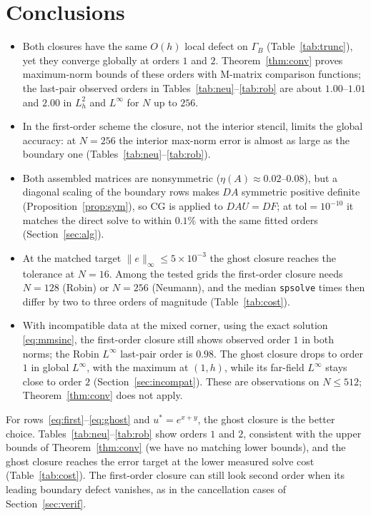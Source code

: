 \documentclass[11pt,a4paper]{article}
\theoremstyle{palplain}
\theoremstyle{paldef}
\theoremstyle{palremark}
\newcommand{\GB}{\Gamma_B}
\begin{document}
\section{Conclusions}\label{sec:concl}
\begin{itemize}[leftmargin=2em]
\item Both closures have the same $O(h)$ local defect on $\GB$ (Table~\ref{tab:trunc}), yet they
converge globally at orders $1$ and $2$. Theorem~\ref{thm:conv} proves maximum-norm bounds of
these orders with M-matrix comparison functions; the last-pair observed orders in
Tables~\ref{tab:neu}--\ref{tab:rob} are about $1.00$--$1.01$ and $2.00$ in $L^2_h$ and
$L^\infty$ for $N$ up to $256$.
\item In the first-order scheme the closure, not the interior stencil, limits the global
accuracy: at $N=256$ the interior max-norm error is almost as large as the boundary one
(Tables~\ref{tab:neu}--\ref{tab:rob}).
\item Both assembled matrices are nonsymmetric ($\eta(A)\approx0.02$--$0.08$), but a diagonal
scaling of the boundary rows makes $DA$ symmetric positive definite
(Proposition~\ref{prop:sym}), so CG is applied to $DAU=DF$; at $\mathrm{tol}=10^{-10}$ it
matches the direct solve to within $0.1\%$ with the same fitted orders (Section~\ref{sec:alg}).
\item At the matched target $\|e\|_\infty\le5\times10^{-3}$ the ghost closure reaches the tolerance
at $N=16$. Among the tested grids the first-order closure needs $N=128$ (Robin) or $N=256$
(Neumann), and the median \texttt{spsolve} times then differ by two to three orders of
magnitude (Table~\ref{tab:cost}).
\item With incompatible data at the mixed corner, using the exact solution
\eqref{eq:mmsinc}, the first-order closure still shows observed order $1$ in both norms; the
Robin $L^\infty$ last-pair order is $0.98$. The ghost closure drops to order $1$ in global
$L^\infty$, with the maximum at $(1,h)$, while its far-field $L^\infty$ stays close to order
$2$ (Section~\ref{sec:incompat}). These are observations on $N\le 512$;
Theorem~\ref{thm:conv} does not apply.
\end{itemize}

\noindent For rows~\eqref{eq:first}--\eqref{eq:ghost} and $u^*=e^{x+y}$, the ghost closure is the
better choice. Tables~\ref{tab:neu}--\ref{tab:rob} show orders $1$ and $2$, consistent with the
upper bounds of Theorem~\ref{thm:conv} (we have no matching lower bounds), and the ghost closure
reaches the error target at the lower measured solve cost (Table~\ref{tab:cost}). The
first-order closure can still look second order when its leading boundary defect vanishes, as
in the cancellation cases of Section~\ref{sec:verif}.
\end{document}
